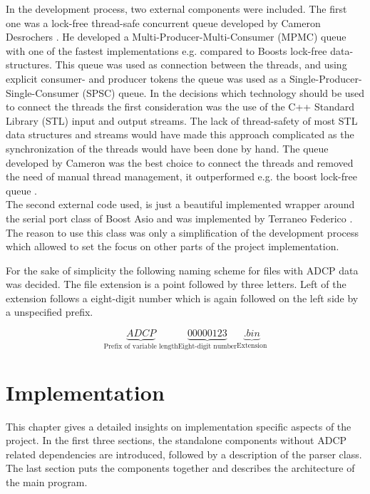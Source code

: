 In the development process, two external components were included. The first one was a lock-free thread-safe concurrent queue developed by Cameron Desrochers \cite{moody}. He developed a Multi-Producer-Multi-Consumer (MPMC) queue with one of the fastest implementations e.g. compared to Boosts lock-free data-structures. This queue was used as connection between the threads, and using explicit consumer- and producer tokens the queue was used as a Single-Producer-Single-Consumer (SPSC) queue. In the decisions which technology should be used to connect the threads the first consideration was the use of the C++ Standard Library (STL)  input and output streams. The lack of thread-safety of most STL data structures and streams would have made this approach complicated as the synchronization of the threads would have been done by hand. The queue developed by Cameron was the best choice to connect the threads and removed the need of manual thread management, it outperformed e.g. the boost lock-free queue \cite{boost_lockfree}.\\
The second external code used, is just a beautiful implemented wrapper around the serial port class of Boost Asio and was implemented by Terraneo Federico \cite{serport}. The reason to use this class was only a simplification of the development process which allowed to set the focus on other parts of the project implementation.

For the sake of simplicity the following naming scheme for files with ADCP data was decided. The file extension is a point followed by three letters. Left of the extension follows a  eight-digit number which is again followed on the left side by a unspecified prefix.

$$ \underbrace{ADCP}_{\text{Prefix of variable length}}\underbrace{00000123}_{\text{Eight-digit number}}\underbrace{.bin}_{\text{Extension}}$$

\chapter{Implementation}
This chapter gives a detailed insights on implementation specific aspects of the project. In the first three sections, the standalone components without ADCP related dependencies  are introduced, followed by a description of the parser class. The last section puts the components together and describes the architecture of the main program.  
